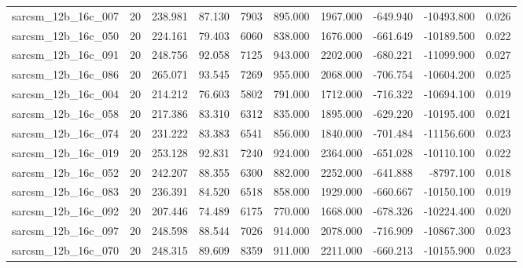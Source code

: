 \begin{tabular}{lrrrrrrrrr}
sarcsm\_12b\_16c\_007 & 20 & 238.981 & 87.130 & 7903 & 895.000 & 1967.000 & -649.940 & -10493.800 & 0.026 \\
sarcsm\_12b\_16c\_050 & 20 & 224.161 & 79.403 & 6060 & 838.000 & 1676.000 & -661.649 & -10189.500 & 0.022 \\
sarcsm\_12b\_16c\_091 & 20 & 248.756 & 92.058 & 7125 & 943.000 & 2202.000 & -680.221 & -11099.900 & 0.027 \\
sarcsm\_12b\_16c\_086 & 20 & 265.071 & 93.545 & 7269 & 955.000 & 2068.000 & -706.754 & -10604.200 & 0.025 \\
sarcsm\_12b\_16c\_004 & 20 & 214.212 & 76.603 & 5802 & 791.000 & 1712.000 & -716.322 & -10694.100 & 0.019 \\
sarcsm\_12b\_16c\_058 & 20 & 217.386 & 83.310 & 6312 & 835.000 & 1895.000 & -629.220 & -10195.400 & 0.021 \\
sarcsm\_12b\_16c\_074 & 20 & 231.222 & 83.383 & 6541 & 856.000 & 1840.000 & -701.484 & -11156.600 & 0.023 \\
sarcsm\_12b\_16c\_019 & 20 & 253.128 & 92.831 & 7240 & 924.000 & 2364.000 & -651.028 & -10110.100 & 0.022 \\
sarcsm\_12b\_16c\_052 & 20 & 242.207 & 88.355 & 6300 & 882.000 & 2252.000 & -641.888 & -8797.100 & 0.018 \\
sarcsm\_12b\_16c\_083 & 20 & 236.391 & 84.520 & 6518 & 858.000 & 1929.000 & -660.667 & -10150.100 & 0.019 \\
sarcsm\_12b\_16c\_092 & 20 & 207.446 & 74.489 & 6175 & 770.000 & 1668.000 & -678.326 & -10224.400 & 0.020 \\
sarcsm\_12b\_16c\_097 & 20 & 248.598 & 88.544 & 7026 & 914.000 & 2078.000 & -716.909 & -10867.300 & 0.023 \\
sarcsm\_12b\_16c\_070 & 20 & 248.315 & 89.609 & 8359 & 911.000 & 2211.000 & -660.213 & -10155.900 & 0.023 \\
\bottomrule
\end{tabular}
